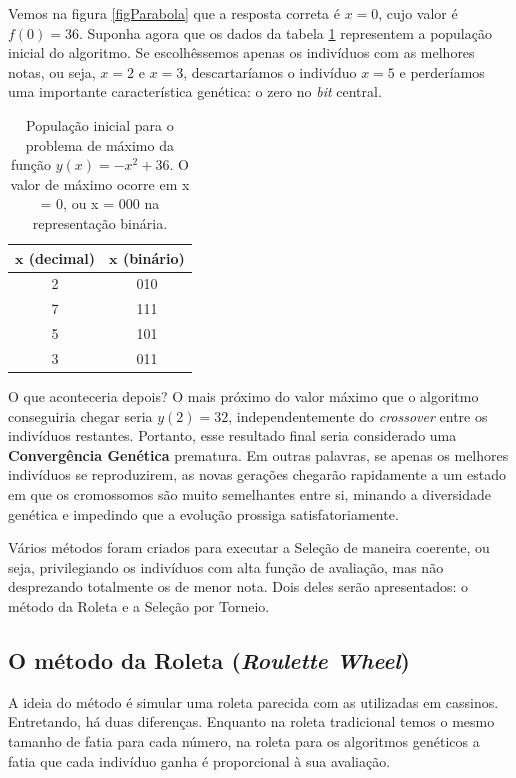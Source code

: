 	 Vemos na figura \ref{figParabola} que a resposta correta é $x = 0$, cujo valor é $f(0) = 36$. Suponha agora que os dados da tabela \ref{tabFuncMax} representem a população inicial do algoritmo. Se escolhêssemos apenas os indivíduos com as melhores notas, ou seja, $x = 2$ e $x = 3$, descartaríamos o indivíduo $x = 5$ e perderíamos uma importante característica genética: o zero no \textit{bit} central.
	 
\begin{table}[htp]
		\caption{\label{tabFuncMax}População inicial para o problema de máximo da função $y(x) = -x^2 + 36$. O valor de máximo ocorre em x = 0, ou x = 000 na representação binária.}
		\begin{center}
			\begin{tabular}{c|c}
				\hline
				$\textbf{x}$ (decimal)		& $\textbf{x}$ (binário) \\
				\hline
				2							& 010 \\
				7							& 111 \\
				5							& 101 \\	
				3							& 011 \\
				\hline
			\end{tabular}
		\end{center}
	\end{table}
		
		O que aconteceria depois? O mais próximo do valor máximo que o algoritmo conseguiria chegar seria $y(2) = 32$, independentemente do \textit{crossover} entre os indivíduos restantes. Portanto, esse resultado final seria considerado uma \textbf{Convergência Genética} prematura. Em outras palavras, se apenas os melhores indivíduos se reproduzirem, as novas gerações chegarão rapidamente a um estado em que os cromossomos são muito semelhantes entre si, minando a diversidade genética e impedindo que a evolução prossiga satisfatoriamente.
		
		Vários métodos foram criados para executar a Seleção de maneira coerente, ou seja, privilegiando os indivíduos com alta função de avaliação, mas não desprezando totalmente os de menor nota. Dois deles serão apresentados: o método da Roleta e a Seleção por Torneio.
	
	\subsection{O método da Roleta (\textit{Roulette Wheel})}
	
	A ideia do método é simular uma roleta parecida com as utilizadas em cassinos. Entretando, há duas diferenças. Enquanto na roleta tradicional temos o mesmo tamanho de fatia para cada número, na roleta para os algoritmos genéticos a fatia que cada indivíduo ganha é proporcional à sua avaliação.
	
